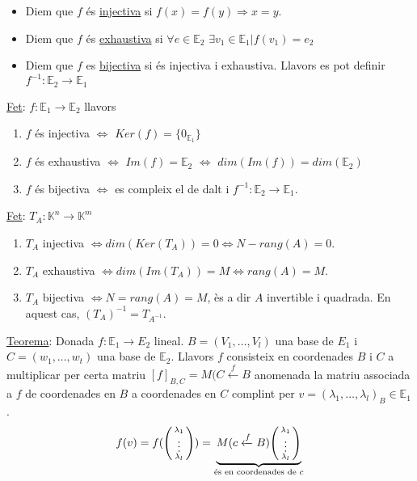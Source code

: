 \begin{itemize}
    \item Diem que $f$ és \underline{injectiva} si $f(x) = f(y) \Rightarrow x = y$.
    \item Diem que $f$ és \underline{exhaustiva} si $\forall e \in \mathbb{E}_2$ $\exists v_1 \in \mathbb{E}_1| f(v_1) = e_2$
    \item Diem que $f$ es \underline{bijectiva} si és injectiva i exhaustiva. Llavors es pot definir $f^{-1}: \mathbb{E}_2 \rightarrow \mathbb{E}_1$
\end{itemize}
\underline{Fet}: $f: \mathbb{E}_1 \rightarrow \mathbb{E}_2$ llavors
\begin{enumerate}
    \item $f$ és injectiva $\Longleftrightarrow$ $Ker(f) = \{0_{\mathbb{E}_1}\}$
    \item $f$ és exhaustiva $\Longleftrightarrow$ $Im(f) = \mathbb{E}_2$ $\Longleftrightarrow$ $dim(Im(f)) = dim(\mathbb{E}_2)$
    \item $f$ és bijectiva $\Longleftrightarrow$ es compleix el de dalt i $f^{-1}: \mathbb{E}_2 \rightarrow \mathbb{E}_1$.
\end{enumerate}
\underline{Fet}: $T_A: \mathbb{K}^n \rightarrow \mathbb{K}^m$
\begin{enumerate}
    \item $T_A$ injectiva $\Longleftrightarrow dim(Ker(T_A)) = 0 \Longleftrightarrow N-rang(A) = 0$.
    \item $T_A$ exhaustiva $\Longleftrightarrow dim(Im(T_A)) = M \Longleftrightarrow rang(A) = M$.
    \item $T_A$ bijectiva $\Longleftrightarrow N = rang(A) = M$, ès a dir $A$ invertible i quadrada. En aquest cas, $(T_A)^{-1} = T_{A^{-1}}$.
\end{enumerate}
\underline{Teorema}: Donada $f: \mathbb{E}_1 \rightarrow E_2$ lineal. $B = (V_1, \dots, V_l)$ una base de $E_1$ i $C = (w_1, \dots, w_t)$ una base de $\mathbb{E}_2$. Llavors $f$ consisteix en coordenades $B$ i $C$ a multiplicar per certa matriu $[f]_{B, C} = M(C\xleftarrow{f} B$ anomenada la matriu associada a $f$ de coordenades en $B$ a coordenades en $C$ complint per $v = (\lambda_1, \dots, \lambda_l)_B \in \mathbb{E}_1$.\\
\begin{displaymath}
f(v) = f(\begin{psmallmatrix}
\lambda_1 \\
\vdots \\
\lambda_l
\end{psmallmatrix}) = \underbrace{M(c \xleftarrow{f} B)\begin{psmallmatrix}\lambda_1\\ \vdots \\ \lambda_l \end{psmallmatrix}}_{\text{és en coordenades de }  c}
\end{displaymath}
